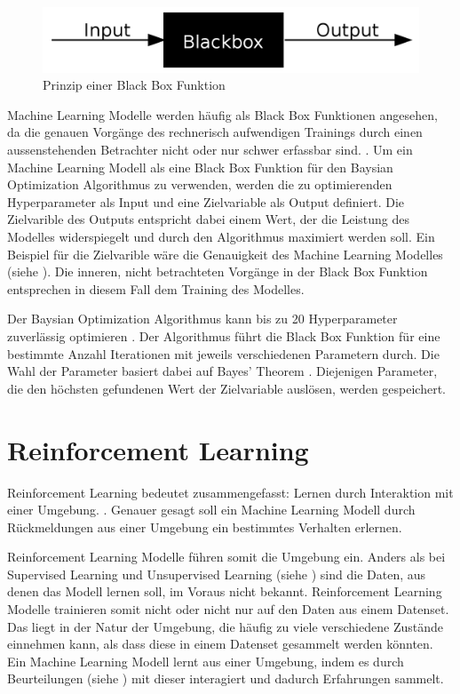 \begin{figure}[!ht]
    \centering
    \includegraphics[width=\textwidth-2cm]{images/theorie/blackbox.png}
    \caption{Prinzip einer Black Box Funktion \cite{noauthor_fileblackboxsvg_nodate}}
    \label{fig:blackbox}
\end{figure}

Machine Learning Modelle werden häufig als Black Box Funktionen angesehen, da
die genauen Vorgänge des rechnerisch aufwendigen Trainings durch einen
aussenstehenden Betrachter nicht oder nur schwer erfassbar sind.
\cite{robbins_machine_2017}. Um ein Machine Learning Modell als eine Black Box
Funktion für den Baysian Optimization Algorithmus zu verwenden, werden die zu
optimierenden Hyperparameter als Input und eine Zielvariable als Output
definiert. Die Zielvarible des Outputs entspricht dabei einem Wert, der die
Leistung des Modelles widerspiegelt und durch den Algorithmus maximiert werden
soll. Ein Beispiel für die Zielvarible wäre die Genauigkeit des Machine Learning
Modelles (siehe ). Die inneren, nicht betrachteten
Vorgänge in der Black Box Funktion entsprechen in diesem Fall dem Training des
Modelles.

Der Baysian Optimization Algorithmus kann bis zu 20 Hyperparameter zuverlässig
optimieren \cite{moriconi_high-dimensional_2020}. Der Algorithmus führt die
Black Box Funktion für eine bestimmte Anzahl Iterationen mit jeweils
verschiedenen Parametern durch. Die Wahl der Parameter basiert dabei auf Bayes'
Theorem \cite[S. 7]{garnett_bayesian_2021}. Diejenigen Parameter, die den
höchsten gefundenen Wert der Zielvariable auslösen, werden gespeichert.


\section{Reinforcement Learning}\label{chap:t_rl}
Reinforcement Learning bedeutet zusammengefasst: Lernen durch Interaktion mit
einer Umgebung. \cite{osinski_what_2018}. Genauer gesagt soll ein Machine
Learning Modell durch Rückmeldungen aus einer Umgebung ein bestimmtes Verhalten
erlernen.

Reinforcement Learning Modelle führen somit die Umgebung ein. Anders als bei
Supervised Learning und Unsupervised Learning (siehe ) sind
die Daten, aus denen das Modell lernen soll, im Voraus nicht bekannt.
Reinforcement Learning Modelle trainieren somit nicht oder nicht nur auf den
Daten aus einem Datenset. Das liegt in der Natur der Umgebung, die häufig zu
viele verschiedene Zustände einnehmen kann, als dass diese in einem Datenset
gesammelt werden könnten. Ein Machine Learning Modell lernt aus einer Umgebung,
indem es durch Beurteilungen (siehe ) mit dieser
interagiert und dadurch Erfahrungen sammelt.
\cite{piyush_verma_what_2021}

